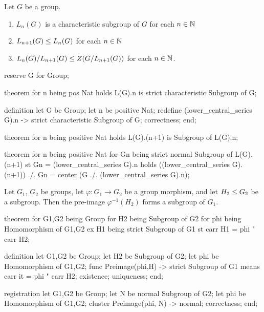\begin{theorem} Let $G$ be a group.
\begin{enumerate}
\item $L_{n}(G)$ is a characteristic subgroup of $G$ for each $n\in\mathbb{N}$
\item $L_{n+1}(G)\leq L_{n}(G)$ for each $n\in\mathbb{N}$
\item $L_{n}(G)/L_{n+1}(G)\leq Z(G/L_{n+1}(G))$ for each $n\in\mathbb{N}$.
\end{enumerate}
\end{theorem}

\begin{mizar}
reserve G for Group;

theorem
  for n being pos Nat
  holds L(G).n is strict characteristic Subgroup of G;

definition
  let G be Group;
  let n be positive Nat;
  redefine (lower_central_series G).n -> strict
  characteristic Subgroup of G;
  correctness;
end;

theorem
  for n being positive Nat
  holds L(G).(n+1) is Subgroup of L(G).n;

theorem
  for n being positive Nat
  for Gn being strict normal Subgroup of L(G).(n+1)
  st Gn = (lower_central_series G).n
  holds ((lower_central_series G).(n+1)) ./. Gn
         = center (G ./. (lower_central_series G).n);
\end{mizar}

\begin{theorem}
Let $G_{1}$, $G_{2}$ be groups, let $\varphi\colon G_{1}\to G_{2}$ be a
group morphism, and let $H_{2}\leq G_{2}$ be a subgroup.
Then the pre-image $\varphi^{-1}(H_{2})$ forms a subgroup of $G_{1}$.
\end{theorem}

\begin{mizar}
theorem
  for G1,G2 being Group
  for H2 being Subgroup of G2
  for phi being Homomorphism of G1,G2
  ex H1 being strict Subgroup of G1
  st carr H1 = phi " carr H2;

definition
  let G1,G2 be Group;
  let H2 be Subgroup of G2;
  let phi be Homomorphism of G1,G2;
  func Preimage(phi,H) -> strict Subgroup of G1 means
  carr it = phi " carr H2;
  existence;
  uniqueness;
end;

registration
  let G1,G2 be Group;
  let N be normal Subgroup of G2;
  let phi be Homomorphism of G1,G2;
  cluster Preimage(phi, N) -> normal;
  correctness;
end;
\end{mizar}

